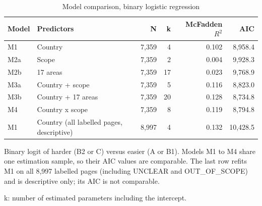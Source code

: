 \begin{table}[htbp]
\centering
\begin{threeparttable}
\caption{Model comparison, binary logistic regression}
\label{tab:regression-grid}
\begin{tabular}{llrrrr}
\hline
Model & Predictors & N & k & McFadden $R^2$ & AIC \\
\hline
M1 & Country & 7,359 & 4 & 0.102 & 8,958.4 \\
M2a & Scope & 7,359 & 2 & 0.004 & 9,928.3 \\
M2b & 17 areas & 7,359 & 17 & 0.023 & 9,768.9 \\
M3a & Country + scope & 7,359 & 5 & 0.116 & 8,823.0 \\
M3b & Country + 17 areas & 7,359 & 20 & 0.128 & 8,734.8 \\
M4 & Country x scope & 7,359 & 8 & 0.119 & 8,794.8 \\
\hline
M1 & Country (all labelled pages, descriptive) & 8,997 & 4 & 0.132 & 10,428.5 \\
\hline
\end{tabular}
\begin{tablenotes}
\footnotesize
\item Binary logit of harder (B2 or C) versus easier (A or B1). Models M1 to M4 share one estimation sample, so their AIC values are comparable. The last row refits M1 on all 8,997 labelled pages (including UNCLEAR and OUT\_OF\_SCOPE) and is descriptive only; its AIC is not comparable.
\item k: number of estimated parameters including the intercept.
\end{tablenotes}
\end{threeparttable}
\end{table}
